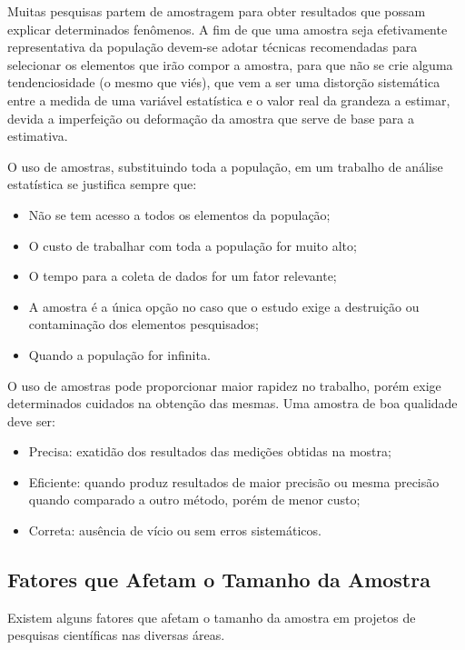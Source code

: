 \newpage 

Muitas pesquisas partem de amostragem para obter resultados que possam explicar determinados fenômenos. A fim de que uma amostra seja efetivamente representativa da população devem-se adotar técnicas recomendadas para selecionar os elementos que irão compor a amostra, para que não se crie alguma tendenciosidade (o mesmo que viés), que vem a ser uma distorção sistemática entre a medida de uma variável estatística e o valor real da grandeza a estimar, devida a imperfeição ou deformação da amostra que serve de base para a estimativa.\vskip0.3cm


O uso de amostras, substituindo toda a população, em um trabalho de análise estatística se justifica sempre que:
\begin{itemize}
\item Não se tem acesso a todos os elementos da população;
\item O custo de trabalhar com toda a população for muito alto;
\item O tempo para a coleta de dados for um fator relevante;
\item A amostra é a única opção no caso que o estudo exige a destruição ou contaminação dos elementos pesquisados;
\item Quando a população for infinita.
\end{itemize}


O uso de amostras pode proporcionar maior rapidez no trabalho, porém exige determinados cuidados na obtenção das mesmas. Uma amostra de boa qualidade deve ser:

\begin{itemize}
\item Precisa: exatidão dos resultados das medições obtidas na mostra;
\item Eficiente: quando produz resultados de maior precisão ou mesma precisão quando comparado a outro método, porém de menor custo;
\item Correta: ausência de vício ou sem erros sistemáticos.
\end{itemize}

\subsection{Fatores que Afetam o Tamanho da Amostra} 
\inic Existem alguns fatores que afetam o tamanho da amostra em projetos de pesquisas científicas nas diversas áreas.

